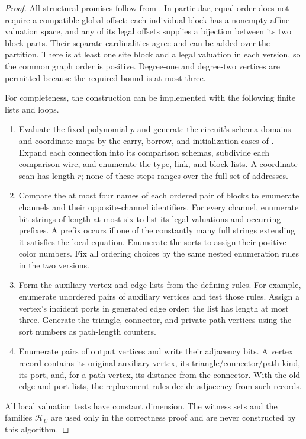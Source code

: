 \documentclass[11pt]{article}
\theoremstyle{definition}
\newcommand{\cH}{\mathcal H}
\begin{document}
\begin{proof}
All structural promises follow from .
In particular, equal order does not require a compatible global offset:
each individual block has a nonempty affine valuation space, and any of
its legal offsets supplies a bijection between its two block parts.
Their separate cardinalities agree and can be added over the partition.
There is at least one site block and a legal valuation in each version,
so the common graph order is positive.  Degree-one and degree-two vertices
are permitted because the required bound is at most three.

For completeness, the construction can be implemented with the following
finite lists and loops.
\begin{enumerate}
\item Evaluate the fixed polynomial $p$ and generate the circuit's schema
      domains and coordinate maps by the carry, borrow, and initialization
      cases of .  Expand each connection into
      its comparison schemas, subdivide each comparison wire, and
      enumerate the type, link, and block lists.  A coordinate scan has
      length $r$; none of these steps ranges over the full set of
      addresses.
\item Compare the at most four names of each ordered pair of blocks to
      enumerate channels and their opposite-channel identifiers.  For
      every channel, enumerate bit strings of length at most six to list
      its legal valuations and occurring prefixes.  A prefix occurs if
      one of the constantly many full strings extending it satisfies the
      local equation.  Enumerate the sorts to assign their positive
      color numbers.  Fix all ordering choices by the same nested
      enumeration rules in the two versions.
\item Form the auxiliary vertex and edge lists from the defining rules.
      For example, enumerate unordered pairs of auxiliary vertices and
      test those rules.  Assign a vertex's incident ports in generated
      edge order; the list has length at most three.  Generate the
      triangle, connector, and private-path vertices using the sort
      numbers as path-length counters.
\item Enumerate pairs of output vertices and write their adjacency bits.
      A vertex record contains its original auxiliary vertex, its
      triangle/connector/path kind, its port, and, for a path vertex,
      its distance from the connector.  With the old edge and port lists,
      the replacement rules decide adjacency from such records.
\end{enumerate}
All local valuation tests have constant dimension.  The witness sets and
the families $\cH_U$ are used only in the correctness proof and are never
constructed by this algorithm.


\end{proof}
\end{document}

